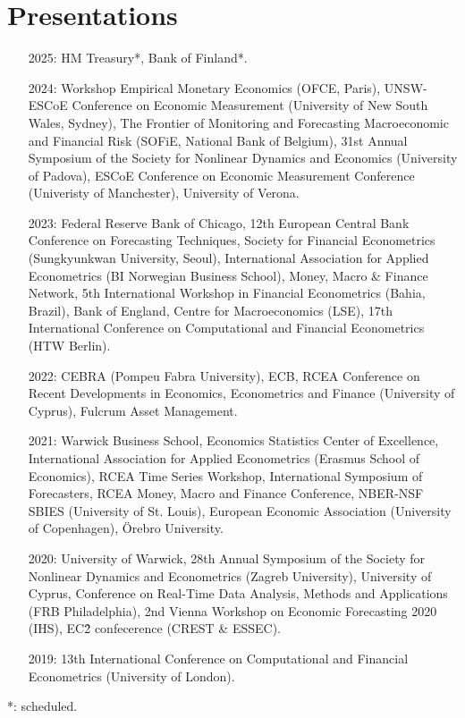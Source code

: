 \documentclass[a4paper,12pt]{article}
\begin{document}
\section{Presentations}
\begin{itemize}
    \item[2025:] HM Treasury*, Bank of Finland*. 
    \item[2024:] Workshop Empirical Monetary Economics (OFCE, Paris), UNSW-ESCoE Conference on Economic Measurement (University of New South Wales, Sydney), The Frontier of Monitoring and Forecasting Macroeconomic and Financial Risk (SOFiE, National Bank of Belgium), 31st Annual Symposium of the Society for Nonlinear Dynamics and Economics (University of Padova), ESCoE Conference on Economic Measurement Conference (Univeristy of Manchester), University of Verona.
    \item[2023:] Federal Reserve Bank of Chicago, 12th European Central Bank Conference on Forecasting Techniques, Society for Financial Econometrics (Sungkyunkwan University, Seoul), International Association for Applied Econometrics (BI Norwegian Business School), Money, Macro \& Finance Network, 5th International Workshop in Financial Econometrics (Bahia, Brazil), Bank of England, Centre for Macroeconomics (LSE), 17th International Conference on Computational and Financial Econometrics (HTW Berlin). 
    \item[2022:] CEBRA (Pompeu Fabra University), ECB, RCEA Conference on Recent Developments in Economics, Econometrics and Finance (University of Cyprus), Fulcrum Asset Management.
    \item[2021:] Warwick Business School, Economics Statistics Center of Excellence, International Association for Applied Econometrics (Erasmus School of Economics),  RCEA Time Series Workshop, International Symposium of Forecasters,  RCEA Money, Macro and Finance Conference, NBER-NSF SBIES (University of St. Louis), European Economic Association (University of Copenhagen), \"Orebro University.
    \item[2020:] University of Warwick, 28th Annual Symposium of the Society for Nonlinear Dynamics and Econometrics (Zagreb University), University of Cyprus, Conference on Real-Time Data Analysis, Methods and Applications (FRB Philadelphia), 2nd Vienna Workshop on Economic Forecasting 2020 (IHS), EC\^2 confecerence (CREST \& ESSEC).
    \item[2019:] 13th International Conference on Computational and Financial Econometrics (University of London).
\end{itemize}
*: scheduled.
\end{document}
